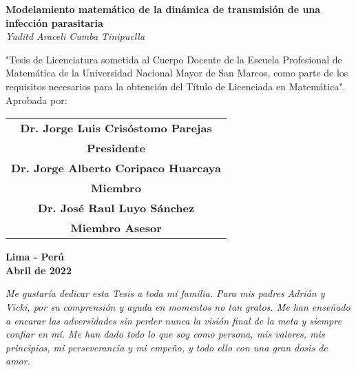 \begin{titlepage}

\begin{center}
{\bf \Large Modelamiento matemático de la dinámica de transmisión de una infección parasitaria} \\ 
{\sl \large Yuditd Araceli Cumba Tinipuclla} 
\end{center}

\vspace{1cm}

{\normalsize "Tesis de Licenciatura sometida al Cuerpo Docente de la Escuela Profesional de Matem\'atica de la Universidad Nacional Mayor de San Marcos, como parte de los requisitos necesarios para la obtenci\'on del T\'itulo de Licenciada en Matem\'atica".} \\

{\large Aprobada por:}

\vspace{2cm}

\begin{center}
\begin{minipage}{6cm}
\begin{tabular}{c}
\hline
{\bf Dr. Jorge Luis Crisóstomo Parejas }\\{\bf Presidente} \\[2cm]
\hline
{\bf Dr. Jorge Alberto Coripaco Huarcaya}\\{\bf Miembro} \\[2cm]
\hline
{\bf Dr. José Raul Luyo Sánchez}\\{\bf Miembro Asesor} \\[2cm]
\end{tabular}
\end{minipage}
\end{center}
\begin{center}
{\bf Lima - Per\'u} \\
\vspace{0.3cm}
{\bf Abril de 2022}
\end{center}

\end{titlepage}
\newpage
\newpage
\begin{titlepage}

\vspace*{9cm}

{\renewcommand{\baselinestretch}{1.2}\small\small

\begin{center}
\begin{minipage}{8cm}
\textit{Me gustaría dedicar esta Tesis a toda mi familia. Para mis padres Adrián y Vicki, por su comprensión y ayuda en momentos no tan gratos. Me han enseñado a encarar las adversidades sin perder nunca la visión final de la meta y siempre confiar en mí. Me han dado todo lo que soy como persona, mis valores, mis principios, mi perseverancia y mi empeño, y todo ello con una gran dosis de amor.\\}  

\end{minipage}
\end{center}}
\end{titlepage}
